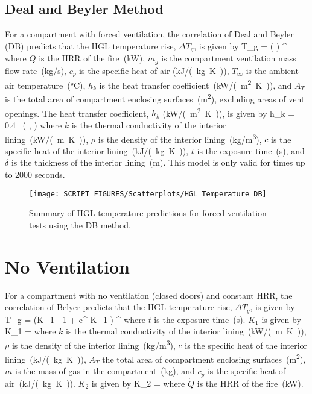 \subsection{Deal and Beyler Method}

For a compartment with forced ventilation, the correlation of Deal and Beyler (DB) predicts that the HGL temperature rise, $\Delta T_g$, is given by
\be
\Delta T_g = \left(  \right) \quad ^
\label{eq:DB}
\ee
where $\dot Q$ is the HRR of the fire~(\si{kW}), $\dot m_g$ is the compartment ventilation mass flow rate~(\si{kg/s}), $c_p$ is the specific heat of air (\si{kJ/(kg.K)}), $T_\infty$ is the ambient air temperature~(\si{\celsius}), $h_k$ is the heat transfer coefficient~(\si{kW/(m^2.K)}), and $A_T$ is the total area of compartment enclosing surfaces~(\si{m^2}), excluding areas of vent openings. The heat transfer coefficient, $h_k$ (\si{kW/(m^2.K)}), is given by 
\be
h_k = 0.4\  \left(  ,  \right)
\label{eq:DB_hk}
\ee
where $k$ is the thermal conductivity of the interior lining~(\si{kW/(m.K)}), $\rho$ is the density of the interior lining~(\si{kg/m^3}), $c$ is the specific heat of the interior lining~(\si{kJ/(kg.K)}), $t$ is the exposure time~(\si{\second}), and $\delta$ is the thickness of the interior lining~(\si{m}). This model is only valid for times up to 2000 seconds.

\begin{figure}[!ht]
\begin{center}
\texttt{[image: SCRIPT\_FIGURES/Scatterplots/HGL\_Temperature\_DB]}
\end{center}
\caption[Summary of HGL temperature predictions for forced ventilation tests (DB)]
{Summary of HGL temperature predictions for forced ventilation tests using the DB method.}
\label{HGL_Summary_Forced_Ventilation_DB}
\end{figure}


\clearpage


\section{No Ventilation}

For a compartment with no ventilation (closed doors) and constant HRR, the correlation of Belyer predicts that the HGL temperature rise, $\Delta T_g$, is given by
\be
\Delta T_g =  (K_1  - 1 + e^{-K_1 }) \quad ^
\label{eq:Beyler}
\ee
where $t$ is the exposure time~(\si{\second}). $K_1$ is given by
\be
K_1 = 
\label{eq:Beyler_K1}
\ee
where $k$ is the thermal conductivity of the interior lining~(\si{kW/(m.K)}), $\rho$ is the density of the interior lining~(\si{kg/m^3}), $c$ is the specific heat of the interior lining~(\si{kJ/(kg.K)}), $A_T$ the total area of compartment enclosing surfaces~(\si{m^2}), $m$ is the mass of gas in the compartment~(\si{kg}), and $c_p$ is the specific heat of air~(\si{kJ/(kg.K)}). $K_2$ is given by
\be
K_2 = 
\label{eq:Beyler_K2}
\ee
where $\dot Q$ is the HRR of the fire~(\si{kW}).

